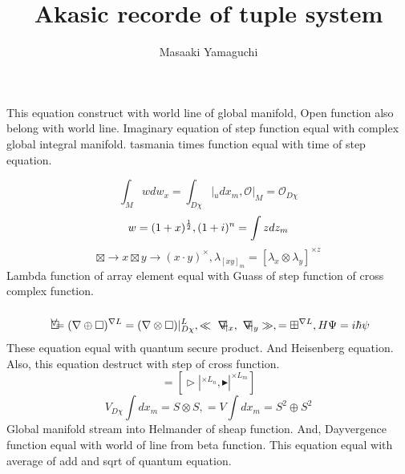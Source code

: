 \documentclass{jsarticle}
\begin{document}
\title{Akasic recorde of tuple system}
\author{Masaaki Yamaguchi}
\date{}
\maketitle

    \newcommand{\variint}{%
	\begin{picture}(15,30)
		\put(0,0){
			$ \iint $}
		\put(0,5){\line(15,0){15}}
	\end{picture} %
}

\newcommand{\variiint}{%
	\begin{picture}(15,15)
		\put(0,0){
			$ \iiint $}
		\put(0,5){\line(15,0){20}}
	\end{picture} %
}



 \newcommand{\alearletter}{%
	 \begin{picture}(10,20)
		 \put(0,0){
			 $ \square $}
		 \put(0,0){\line(1,1){10}}
	 \end{picture} %
	 }

\newcommand{\letter}{%
	\begin{picture}(5,5)
		\put(0,0){
			$ \square $}
		\put(3,3){$\vee$}
	\end{picture} %
}
 \newcommand{\secproduct}{%
	 \begin{picture}(10,20)
		 \put(0,0){
			 $ \nabla $}
		 \put(5,0){+}
	 \end{picture} %
	 }
 \newcommand{\average}{%
	 \begin{picture}(5,5)
		 \put(0,0){
			 $ \square $}
		 \put(3,3){$\slash$}
	 \end{picture} %
	 }
\newcommand{\averagesqrt}{%
	 \begin{picture}(5,5)
		 \put(0,0){
			 $ \square $}
		 \put(3,3){$\setminus $}
	 \end{picture} %
	 }

  This equation construct with world line of global manifold,
  Open function also belong with world line.
   Imaginary equation of step function equal with complex global integral
   manifold.
   tasmania times function equal with time of step equation.

  $$\int_M w dw_x = \int_{D\chi}|_u dx_m, 
   \mathcal{O}|_M = \mathcal{O}_{D\chi} $$
 $$ w = (1 + x)^{1 \over 2}, 
   (1 + i)^n = \int z dz_m $$
  $$ \boxtimes \to x \boxtimes y \to (x \cdot y)^{\times}, 
   \lambda_{[xy]_m} = [\lambda_x \otimes \lambda_y]^{\times z} $$
   Lambda function of array element equal with Guass of step function
   of cross complex function.
  $$ \letter = (\nabla \oplus \square)^{\nabla L} 
   = (\nabla \otimes \square)|^{L}_{D\chi}, 
   \ll \secproduct|_x, \secproduct|_y \gg, 
   = \boxplus^{\nabla L},
   H\Psi = i \hbar \psi $$
   These equation equal with quantum secure product.
   And Heisenberg equation.
Also, this equation destruct with step of cross function.
  $$ = [\vartriangleright|^{\times L_n}, 
  \blacktriangleright|^{\times L_m}] $$
  $$ V_{D\chi}\int dx_m = S \otimes S, 
   = V\int dx_m = S^2 \oplus S^2 $$
   Global manifold stream into Helmander of sheap function.
 And, Dayvergence function equal with world of line from beta function.
	 This equation equal with average of add and sqrt of quantum equation.
\end{document}
